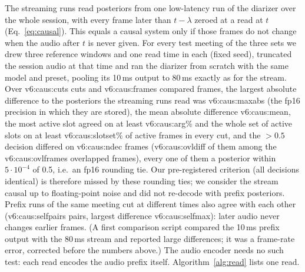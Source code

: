 The streaming runs read posteriors from one low-latency run of the diarizer over the whole session, with every frame
later than $t-\lambda$ zeroed at a read at $t$ (Eq.~\ref{eq:causal}). This equals a causal system only if those frames
do not change when the audio after $t$ is never given. For every test meeting of the three sets we drew three reference
windows and one read time in each (fixed seed), truncated the session audio at that time and ran the diarizer from
scratch with the same model and preset, pooling its 10\,ms output to 80\,ms exactly as for the stream. Over
\num{v6:caus:cuts} cuts and \num{v6:caus:frames} compared frames, the largest absolute difference to the posteriors the
streaming runs read was \num{v6:caus:maxabs} (the fp16 precision in which they are stored), the mean absolute difference \num{v6:caus:mean},
the most active slot agreed on at least \num{v6:caus:arg}\% and the whole set of active slots on at least
\num{v6:caus:slotset}\% of active frames in every cut, and the $>0.5$ decision differed on \num{v6:caus:ndec} frames
(\num{v6:caus:ovldiff} of them among the \num{v6:caus:ovlframes} overlapped frames), every one of them a posterior within
$5\cdot10^{-4}$ of 0.5, i.e.\ an fp16 rounding tie. Our pre-registered criterion (all decisions
identical) is therefore missed by these rounding ties; we consider the stream causal up to floating-point noise and did
not re-decode with prefix posteriors. Prefix runs of the same meeting cut at different times also agree with each other
(\num{v6:caus:selfpairs} pairs, largest difference \num{v6:caus:selfmax}): later audio never changes earlier frames.
(A first comparison script compared the 10\,ms prefix output with the 80\,ms stream and reported large differences; it
was a frame-rate error, corrected before the numbers above.) The audio encoder needs no such test: each read
encodes the audio prefix itself. Algorithm~\ref{alg:read} lists one read.

